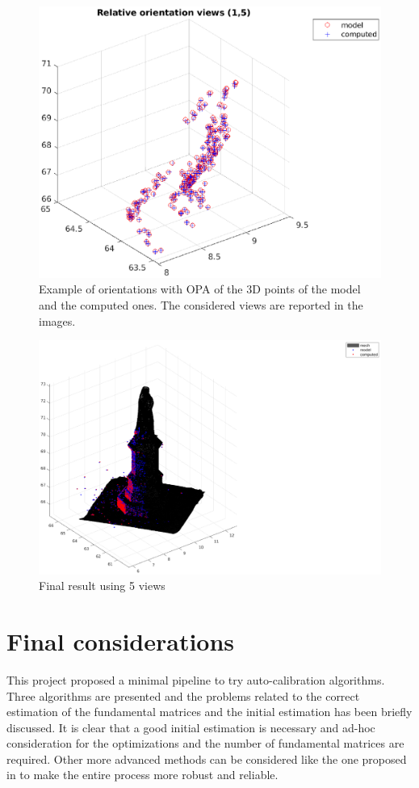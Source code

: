 \documentclass[11pt]{article}
\begin{document}
\begin{figure}[H]
    \includegraphics[scale=0.45]{images/relative_4.eps}
    \caption{Example of orientations with OPA of the 3D points of the model and the computed ones. The considered views are reported in the images.}
    \label{fig:relative}
\end{figure}

\begin{figure}[H]
    \centering
    \hspace*{-7cm}
    \includegraphics[scale=0.65]{images/statue.eps}
    \caption{Final result using 5 views}
    \label{fig:statue}
\end{figure}

\section{Final considerations}
This project proposed a minimal pipeline to try auto-calibration algorithms. Three algorithms are presented and the problems related to the correct estimation of the fundamental matrices and the initial estimation has been briefly discussed. It is clear that a good initial estimation is necessary and ad-hoc consideration for the optimizations and the number of fundamental matrices are required. Other more advanced methods can be considered like the one proposed in \cite{Gherardi10} to make the entire process more robust and reliable. 
\end{document}

